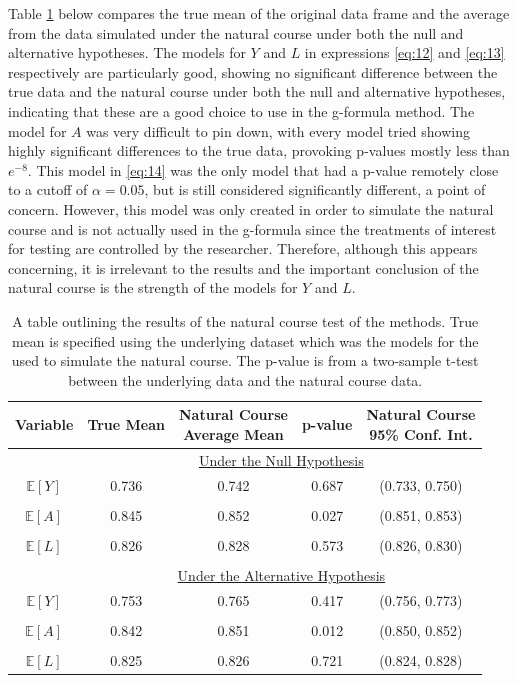 Table \ref{naturalcourse} below compares the true mean of the original data frame and the average from the data simulated under the natural course under both the null and alternative hypotheses.  The models for $Y$ and $L$ in expressions \ref{eq:12} and \ref{eq:13} respectively are particularly good, showing no significant difference between the true data and the natural course under both the null and alternative hypotheses, indicating that these are a good choice to use in the g-formula method.  The model for $A$ was very difficult to pin down, with every model tried showing highly significant differences to the true data, provoking p-values mostly less than $e^{-8}$.  This model in \ref{eq:14} was the only model that had a p-value remotely close to a cutoff of $\alpha = 0.05$, but is still considered significantly different, a point of concern.  However, this model was only created in order to simulate the natural course and is not actually used in the g-formula since the treatments of interest for testing are controlled by the researcher.  Therefore, although this appears concerning, it is irrelevant to the results and the important conclusion of the natural course is the strength of the models for $Y$ and $L$.  


\begin{table}[h!]
\centering
\begin{tabular}{c | c c c c}
Variable & True Mean & \shortstack{Natural Course\\ Average Mean} & p-value & \shortstack{Natural Course \\95\% Conf. Int.} \\ 
\hline 
& \multicolumn{4}{c}{\underline{Under the Null Hypothesis}} \\
$\mathbb{E}[Y]$ & 0.736 & 0.742 & 0.687 &(0.733, 0.750) \\ \\
$\mathbb{E}[A]$ & 0.845 & 0.852 & 0.027 &(0.851, 0.853) \\ \\
$\mathbb{E}[L]$ & 0.826 & 0.828 & 0.573 & (0.826, 0.830) \\ \\ 
& \multicolumn{4}{c}{\underline{Under the Alternative Hypothesis}} \\
$\mathbb{E}[Y]$ & 0.753 & 0.765 &0.417 &(0.756, 0.773) \\ \\
$\mathbb{E}[A]$ & 0.842 & 0.851 &0.012 &(0.850, 0.852) \\ \\
$\mathbb{E}[L]$ & 0.825 & 0.826 & 0.721 & (0.824, 0.828) 
\end{tabular} \\
\centering
\caption[Natural course of the g-formula simulation]{A table outlining the results of the natural course test of the methods.  True mean is specified using the underlying dataset which was the models for the used to simulate the natural course. The p-value is from a two-sample t-test between the underlying data and the natural course data.  \label{naturalcourse}}
\end{table}



